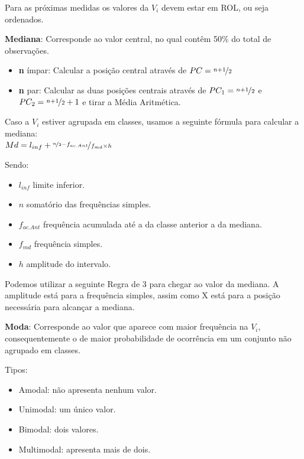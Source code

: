 \documentclass[a4paper,11pt]{article}
\begin{document}
\begin{theo}{}
	Para as próximas medidas os valores da $V_{i}$ devem estar em ROL, ou seja ordenados.
\end{theo}

\textbf{Mediana}: Corresponde ao valor central, no qual contêm 50\% do total de observações.
\begin{itemize} \vspace{-1em}
	\item \textbf{n} ímpar: Calcular a posição central através de $PC = \nicefrac{n + 1}{2}$
	\item \textbf{n} par: Calcular as duas posições centrais através de $PC_{1} = \nicefrac{n + 1}{2}$ e $PC_{2} = \nicefrac{n + 1}{2} + 1$ e tirar a Média Aritmética.
\end{itemize}

Caso a $V_{i}$ estiver agrupada em classes, usamos a seguinte fórmula para calcular a mediana: \\[2mm]
$Md = l_{inf} + \nicefrac{ \nicefrac{n}{2} - f_{ac.Ant}}{f_{md} \times h}$

Sendo: \vspace{-1em}
\begin{itemize}[nolistsep]
	\item $l_{inf}$ limite inferior.
	\item $n$ somatório das frequências simples.
	\item $f_{ac.Ant}$ frequência acumulada até a da classe anterior a da mediana.
	\item $f_{md}$ frequência simples.
	\item $h$ amplitude do intervalo.
\end{itemize}

Podemos utilizar a seguinte Regra de 3 para chegar ao valor da mediana. A amplitude está para a frequência simples, assim como X está para a posição necessária para alcançar a mediana.

\textbf{Moda}: Corresponde ao valor que aparece com maior frequência na $V_{i}$, consequentemente o de maior probabilidade de ocorrência em um conjunto não agrupado em classes.

Tipos: \vspace{-1em}
\begin{itemize}[nolistsep]
	\item Amodal: não apresenta nenhum valor.
	\item Unimodal: um único valor.
	\item Bimodal: dois valores.
	\item Multimodal: apresenta mais de dois.
\end{itemize}
\end{document}
